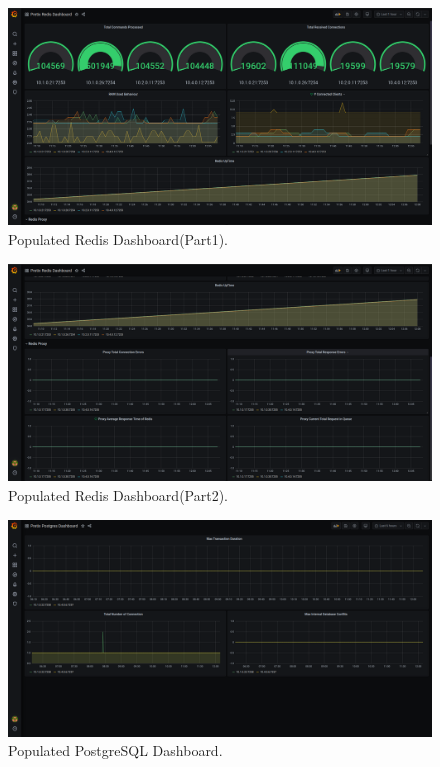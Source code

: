 \documentclass[12pt]{article}
\begin{document}
\begin{figure}[H]
  \includegraphics[width=\linewidth]{images/pretixRedisDashboard.png}
  \caption{Populated Redis Dashboard(Part1).}
  \label{fig:redis1}
\end{figure}

\begin{figure}[H]
  \includegraphics[width=\linewidth]{images/pretixRedis2Dashboard.png}
  \caption{Populated Redis Dashboard(Part2).}
  \label{fig:redis2}
\end{figure}

\begin{figure}[H]
  \includegraphics[width=\linewidth]{images/pretixPostgresDashboard.png}
  \caption{Populated PostgreSQL Dashboard.}
  \label{fig:postgres}
\end{figure}
\end{document}

